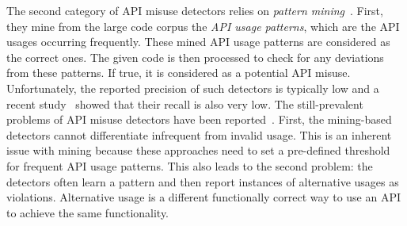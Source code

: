 
%

The second category of API misuse detectors relies on {\em pattern
  mining}~\cite{LZ05,L07,WZL07,RGJ07,NNP+09,AX09,TX09,TX09b,WZ11,MM13,NPVN16}. First,
they mine from the large code corpus the {\em API usage patterns},
which are the API usages occurring frequently. These mined API usage
patterns are considered as the correct ones. The given code is then
processed to check for any deviations from these patterns.  If true,
it is considered as a potential API misuse. Unfortunately, the
reported precision of such detectors is typically low and a recent
study~\cite{ANNN+17} showed that their recall is also very low.
The still-prevalent problems of API misuse detectors have been
reported~\cite{LHXRM16,ABFKMS16}. First, the mining-based detectors
cannot differentiate infrequent from invalid usage. This is an
inherent issue with mining because these approaches need to set a
pre-defined threshold for frequent API usage patterns. This also leads
to the second problem: the detectors often learn a pattern and then
report instances of alternative usages as violations. Alternative
usage is a different functionally correct way to use an API to achieve
the same functionality.


